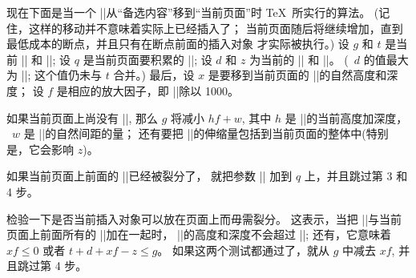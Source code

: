 \ddanger 现在下面是当一个 |\insert|\n 从``备选内容''移到``当前页面''时%
 \TeX\ 所实行的算法。%
(记住，这样的移动并不意味着实际上已经插入了；
当前页面随后将继续增加，直到最低成本的断点，并且只有在断点前面的插入对象%
才实际被执行。)
设 $g$ 和 $t$ 是当前 |\pagegoal| 和 |\pagetotal|;
设 $q$ 是当前页面要积累的 |\insertpenalties|;
设 $d$ 和 $z$ 为当前的 |\pagedepth| 和 |\pageshrink|。%
(~$d$ 的值最大为 |\maxdepth|; 这个值仍未与 $t$ 合并。)
最后，设 $x$ 是要移到当前页面的 |\insert|\n 的自然高度和深度；
设 $f$ 是相应的放大因子，即 |\count|\n 除以 1000。

\ninepoint
{} 如果当前页面上尚没有 |\insert|\n,
那么 $g$ 将减小 $hf+w$,
其中 $h$ 是 |\box|\n 的当前高度加深度，
~$w$ 是 |\skip|\n 的自然间距的量；
还有要把 |\skip|\n 的伸缩量包括到当前页面的整体中(特别是，它会影响 $z$)。

\medbreak
{} 如果当前页面上前面的 |\insert|\n 已经被裂分了，
就把参数 |\floatingpenalty| 加到 $q$ 上，并且跳过第 3 和 4 步。

\medbreak
{} 检验一下是否当前插入对象可以放在页面上而毋需裂分。%
这表示，当把 |\box|\n 与当前页面上前面所有的 |\insert|\n 加在一起时，
|\box|\n 的高度和深度不会超过 |\dimen|\n;
还有，它意味着 $xf\le0$ 或者 $t+d+xf-z\le g$。%
如果这两个测试都通过了，就从 $g$ 中减去 $xf$, 并且跳过第 4 步。

